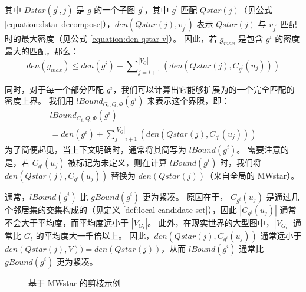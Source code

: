 其中 $Dstar(g^\prime, j)$ 是 $g$ 的一个子图 $g^\prime$，其中 $g^\prime$ 匹配 $Qstar(j)$（见公式 \ref{equation:dstar-decompose}），$den(Qstar(j), v_{j^\prime})$ 表示 $Qstar(j)$ 与 $v_{j^\prime}$ 匹配时的最大密度（见公式 \ref{equation:den-qstar-v}）。
因此，若 $g_{max}$ 是包含 $g^i$ 的密度最大的匹配，那么：
\[
	den(g_{max}) \leq den(g^i) + \sum\nolimits_{j=i+1}^{|V_Q|} \left(den(Qstar(j), C_{g^i}(u_j))\right)
\]

同时，对于每一个部分匹配 $g^i$，我们可以计算出它能够扩展为的一个完全匹配的密度上界。
我们用 $lBound_{G_t, Q, \Phi}(g^i)$ 来表示这个界限，即：
\begin{equation*}
    \begin{multlined}
    lBound_{G_t, Q, \Phi}(g^i) \\ = den(g^i) + \sum\nolimits_{j=i+1}^{|V_Q|} \left(den(Qstar(j), C_{g^i}(u_j))\right)
    \end{multlined}
    \end{equation*}
为了简便起见，当上下文明确时，通常将其简写为 $lBound(g^i)$。
需要注意的是，若 $C_{g^i}(u_j)$ 被标记为未定义，则在计算 $lBound(g^i)$ 时，我们将 $den(Qstar(j), C_{g^i}(u_j))$ 替换为 $den(Qstar(j))$（来自全局的 MWstar）。

通常，$lBound(g^i)$ 比 $gBound(g^i)$ 更为紧凑。
原因在于， $C_{g^i}(u_j)$ 是通过几个邻居集的交集构成的（见定义 \ref{def:local-candidate-set}），因此 $|C_{g^i}(u_j)|$ 通常不会大于平均度，而平均度远小于 $|V_{G_t}|$。
此外，在现实世界的大型图中，$|V_{G_t}|$ 通常比 $G_t$ 的平均度大一千倍以上。
因此，$den(Qstar(j), C_{g^i}(u_j))$ 通常远小于 $den(Qstar(j), V)) = den(Qstar(j))$，从而 $lBound(g^i)$ 通常比 $gBound(g^i)$ 更为紧凑。

\begin{figure}[h!]
\centering
{}
\caption{基于 MWstar 的剪枝示例}
\label{fig:exp:mwstar:pruning}
\end{figure}


